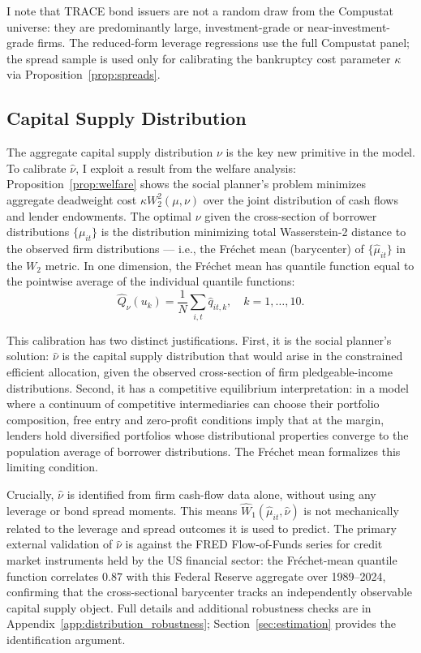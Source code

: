 I note that TRACE bond issuers are not a random draw from the Compustat universe: they are predominantly large, investment-grade or near-investment-grade firms. The reduced-form leverage regressions use the full Compustat panel; the spread sample is used only for calibrating the bankruptcy cost parameter $\kappa$ via Proposition~\ref{prop:spreads}.

\subsection{Capital Supply Distribution}
\label{sec:nu_identification}

The aggregate capital supply distribution $\nu$ is the key new primitive in the model. To calibrate $\hat{\nu}$, I exploit a result from the welfare analysis: Proposition~\ref{prop:welfare} shows the social planner's problem minimizes aggregate deadweight cost $\kappa W_2^2(\mu, \nu)$ over the joint distribution of cash flows and lender endowments. The optimal $\nu$ given the cross-section of borrower distributions $\{\mu_{it}\}$ is the distribution minimizing total Wasserstein-2 distance to the observed firm distributions — i.e., the Fr\'{e}chet mean (barycenter) of $\{\hat{\mu}_{it}\}$ in the $W_2$ metric. In one dimension, the Fr\'{e}chet mean has quantile function equal to the pointwise average of the individual quantile functions:
\[
  \hat{Q}_\nu(u_k) = \frac{1}{N} \sum_{i,t} \hat{q}_{it,k}, \quad k = 1,\ldots,10.
\]

This calibration has two distinct justifications. First, it is the social planner's solution: $\hat{\nu}$ is the capital supply distribution that would arise in the constrained efficient allocation, given the observed cross-section of firm pledgeable-income distributions. Second, it has a competitive equilibrium interpretation: in a model where a continuum of competitive intermediaries can choose their portfolio composition, free entry and zero-profit conditions imply that at the margin, lenders hold diversified portfolios whose distributional properties converge to the population average of borrower distributions. The Fréchet mean formalizes this limiting condition.

Crucially, $\hat{\nu}$ is identified from firm cash-flow data alone, without using any leverage or bond spread moments. This means $\widehat{W}_1(\hat{\mu}_{it}, \hat{\nu})$ is not mechanically related to the leverage and spread outcomes it is used to predict. The primary external validation of $\hat{\nu}$ is against the FRED Flow-of-Funds series for credit market instruments held by the US financial sector: the Fr\'{e}chet-mean quantile function correlates $0.87$ with this Federal Reserve aggregate over 1989--2024, confirming that the cross-sectional barycenter tracks an independently observable capital supply object. Full details and additional robustness checks are in Appendix~\ref{app:distribution_robustness}; Section~\ref{sec:estimation} provides the identification argument.

